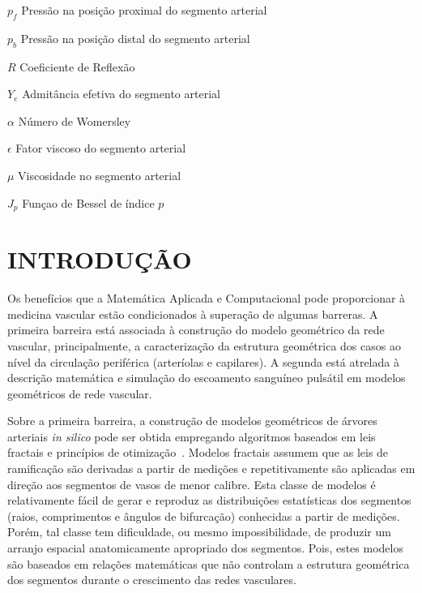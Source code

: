 \documentclass[
        english,			
        brazil			        %
        ,<...>]{abntbibufjf}
\begin{document}
\begin{simbolos}
\item [$p_f$] Pressão na posição proximal do segmento arterial
\item [$p_b$] Pressão na posição distal do segmento arterial
\item [$R$] Coeficiente de Reflexão
\item [$Y_e$] Admitância efetiva do segmento arterial
\item [$\alpha$] Número de Womersley
\item [$\epsilon$] Fator viscoso do segmento arterial
\item [$\mu$] Viscosidade no segmento arterial
\item [$J_p$] Funçao de Bessel de índice $p$
 \end{simbolos}

 
\tableofcontents*
\cleardoublepage


\textual


\chapter{INTRODU\c{C}\~AO}  %

Os benefícios que a Matemática Aplicada e Computacional pode proporcionar à medicina vascular estão condicionados à superação de algumas barreras. A primeira barreira está associada à construção do modelo geométrico da rede vascular, principalmente, a caracterização da estrutura geométrica dos casos ao nível da circulação periférica (arteríolas e capilares). A segunda está atrelada à descrição matemática e simulação do escoamento sanguíneo pulsátil em modelos geométricos de rede vascular.


 Sobre a primeira barreira, a construção de modelos geométricos de árvores arteriais \textit{in silico} pode ser obtida empregando algoritmos baseados em leis fractais \cite{Dawant1986,VanBeek1989} e princípios de otimização~\cite{Karch1999,Queiroz2013,Schreiner1993}. Modelos fractais assumem que as leis de ramificação são derivadas a partir de medições e repetitivamente são aplicadas em direção aos segmentos de vasos de menor calibre. Esta classe de modelos é relativamente fácil de gerar e reproduz as distribuições estatísticas dos segmentos (raios, comprimentos e ângulos de bifurcação) conhecidas a partir de medições. Porém, tal classe tem dificuldade, ou mesmo impossibilidade, de produzir um arranjo espacial anatomicamente apropriado dos segmentos. Pois, estes modelos são baseados em relações matemáticas que não controlam a estrutura geométrica dos segmentos durante o crescimento das redes vasculares. 
\end{document}
